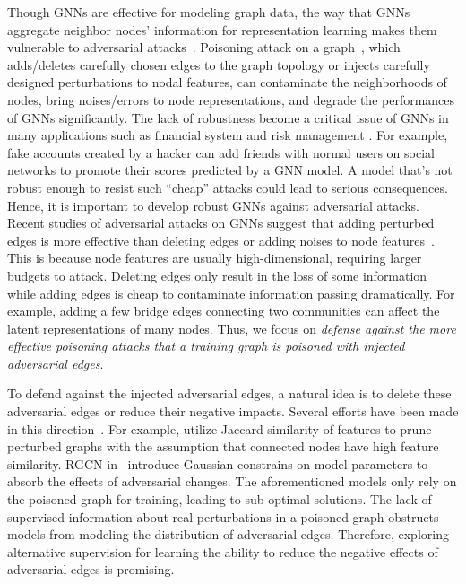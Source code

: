 \documentclass[sigconf]{acmart}
\begin{document}
Though GNNs are effective for modeling graph data, the way that GNNs aggregate neighbor nodes' information for representation learning makes them vulnerable to adversarial attacks~\cite{zugner2018adversarial, zugner2018adversarial2, dai2018adversarial, wu2019adversarial, xu2019topology}.
Poisoning attack on a graph~\cite{zugner2018adversarial}, which adds/deletes carefully chosen edges to the graph topology or injects carefully designed perturbations to nodal features, can contaminate the neighborhoods of nodes, bring noises/errors to node representations, and degrade the performances of GNNs significantly. 
The lack of robustness become a critical issue of GNNs in many applications such as financial system and risk management \cite{akoglu2015graph}. For example, fake accounts created by a hacker can add friends with normal users on social networks to promote their scores predicted by a GNN model. A model that's not robust enough to resist such ``cheap'' attacks could lead to serious consequences.
Hence, it is important to develop robust GNNs against adversarial attacks.
Recent studies of adversarial attacks on GNNs suggest that adding perturbed edges is more effective than deleting edges or adding noises to node features~\cite{wu2019adversarial}. This is because node features are usually high-dimensional, requiring larger budgets to attack. Deleting edges only result in the loss of some information while adding edges is cheap to contaminate information passing dramatically. For example, adding a few bridge edges connecting two communities can affect the latent representations of many nodes. Thus, we focus on \textit{defense against the more effective poisoning attacks that a training graph is poisoned with injected adversarial edges}.

To defend against the injected adversarial edges, a natural idea is to delete these adversarial edges or reduce their negative impacts. Several efforts have been made in this direction~\cite{zhu2019robust,wu2019adversarial,jin2019power}. For example, \citeauthor{wu2019adversarial} \cite{wu2019adversarial} utilize Jaccard similarity of features to prune perturbed graphs with the assumption that connected nodes have high feature similarity. RGCN in~\cite{zhu2019robust} introduce Gaussian constrains on model parameters to absorb the effects of adversarial changes.
The aforementioned models only rely on the poisoned graph for training, leading to sub-optimal solutions.
The lack of supervised information about real perturbations in a poisoned graph obstructs models from modeling the distribution of adversarial edges.
Therefore, exploring alternative supervision for learning the ability to reduce the negative effects of adversarial edges is promising.
\end{document}
